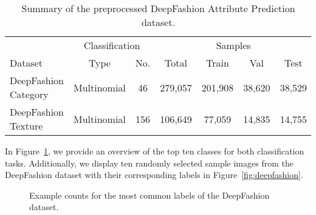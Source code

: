 \begin{table}[H]
	\centering
	\begin{tabular}{ lcccccc } 
		\toprule
		& \multicolumn{2}{c}{Classification} & \multicolumn{4}{c}{Samples} \\
		\cmidrule{2-7}
		Dataset & Type & No. & Total & Train & Val & Test \\
		\midrule
		DeepFashion Category & Multinomial & 46  & 279,057 & 201,908 & 38,620 & 38,529 \\
		DeepFashion Texture  & Multinomial & 156 & 106,649 & 77,059  & 14,835 & 14,755 \\
		\bottomrule
	\end{tabular}
	\caption{Summary of the preprocessed DeepFashion Attribute Prediction dataset.}
	\label{tab:deepfashion-deduplicated}
\end{table}
In Figure~\ref{fig:deepfashion-top-labels}, we provide an overview of the top ten classes for both classification tasks. Additionally, we display ten randomly selected sample images from the DeepFashion dataset with their corresponding labels in Figure~\ref{fig:deepfashion}.
\begin{figure}[H]
	\centering
	\hfill
	\caption{Example counts for the most common labels of the DeepFashion dataset.}
	\label{fig:deepfashion-top-labels}
\end{figure}

